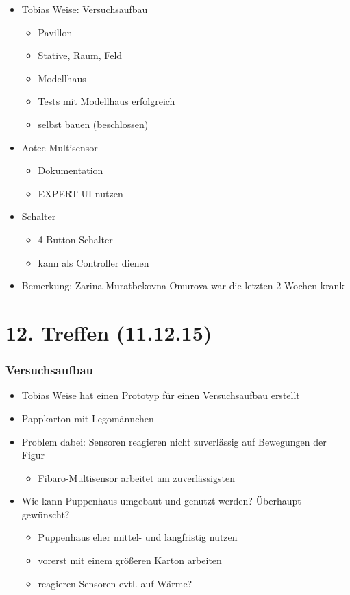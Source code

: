 \begin{itemize}
	\item Tobias Weise: Versuchsaufbau
	\begin{itemize}
		\item Pavillon
		\item Stative, Raum, Feld
		\item Modellhaus
		\item Tests mit Modellhaus erfolgreich
		\item selbst bauen (beschlossen)
	\end{itemize}

	\item Aotec Multisensor
	\begin{itemize}
		\item Dokumentation
		\item EXPERT-UI nutzen
	\end{itemize}

	\item Schalter

	\begin{itemize}
		\item 4-Button Schalter
		\item kann als Controller dienen
	\end{itemize}

	\item Bemerkung: Zarina Muratbekovna Omurova war die letzten 2 Wochen krank
\end{itemize}

\section{12. Treffen (11.12.15)}
\subsubsection{Versuchsaufbau}

\begin{itemize}
	\item Tobias Weise hat einen Prototyp für einen Versuchsaufbau erstellt
	\item Pappkarton mit Legomännchen
	\item Problem dabei: Sensoren reagieren nicht zuverlässig auf Bewegungen der Figur
	\begin{itemize}
		\item Fibaro-Multisensor arbeitet am zuverlässigsten
	\end{itemize}
	\item Wie kann Puppenhaus umgebaut und genutzt werden? Überhaupt gewünscht?
	\begin{itemize}
		\item Puppenhaus eher mittel- und langfristig nutzen
		\item vorerst mit einem größeren Karton arbeiten
		\item reagieren Sensoren evtl. auf Wärme?
	\end{itemize}
\end{itemize}

